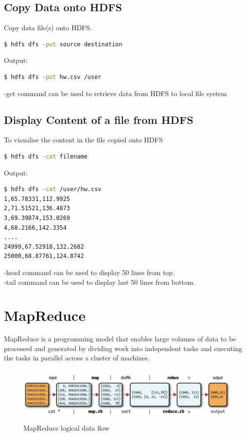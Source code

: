\documentclass[pdf]{beamer}
\begin{document}
\subsection{Copy Data onto HDFS}
\begin{frame}[fragile]{}
Copy data file(s) onto HDFS.
\begin{lstlisting}[language=bash]
$ hdfs dfs -put source destination
\end{lstlisting}

Output: 
\begin{lstlisting}[language=bash]
$ hdfs dfs -put hw.csv /user
\end{lstlisting}
-get command can be used to retrieve data from HDFS to local file system
\end{frame}


\subsection{Display Content of a file from HDFS}
\begin{frame}[fragile]{}
To visualise the content in the file copied onto HDFS
\begin{lstlisting}[language=bash]
$ hdfs dfs -cat filename
\end{lstlisting}
Output: 
\begin{lstlisting}[language=bash]
$ hdfs dfs -cat /user/hw.csv 
1,65.78331,112.9925
2,71.51521,136.4873
3,69.39874,153.0269
4,68.2166,142.3354
....
24999,67.52918,132.2682
25000,68.87761,124.8742
\end{lstlisting}

-head command can be used to display 50 lines from top.
\\
-tail command can be used to display last 50 lines from bottom.
\end{frame}



\section{MapReduce}
\begin{frame}[fragile]{}
MapReduce is a programming model that enables large volumes of data to be processed and generated by dividing work into independent tasks and executing the tasks in parallel across a cluster of machines.

\begin{figure}[ht]
	    \begin{center}
        		\includegraphics[height=1.1in]{13.png}
    \end{center}
    \caption{MapReduce logical data flow\cite{hdg}}
    \end{figure}
\end{frame}
\end{document}
